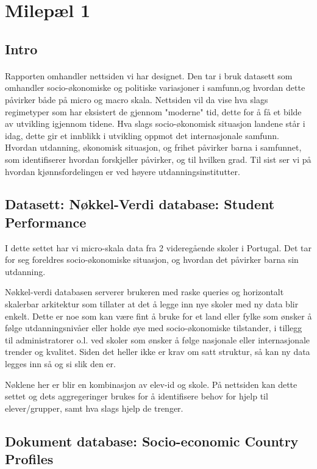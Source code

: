 
\section{Milepæl 1}

\subsection{Intro}
\paragraph{}
Rapporten omhandler nettsiden vi har designet. Den tar i bruk datasett som omhandler socio-økonomiske og politiske variasjoner i samfunn,og hvordan dette påvirker både på micro og macro skala. 
Nettsiden vil da vise hva slags regimetyper som har eksistert de gjennom "moderne" tid, dette for å få et bilde av utvikling igjennom tidene. Hva slags socio-økonomisk situasjon landene står i idag, dette gir et innblikk i utvikling oppmot det internasjonale samfunn. Hvordan utdanning, økonomisk situasjon, og frihet påvirker barna i samfunnet, som identifiserer hvordan forskjeller påvirker, og til hvilken grad. Til sist ser vi på hvordan kjønnsfordelingen er ved høyere utdanningsinstitutter.

\subsection{Datasett: Nøkkel-Verdi database: Student Performance}
I dette settet har vi micro-skala data fra 2 videregående skoler i Portugal. Det tar for seg foreldres socio-økonomiske situasjon, og hvordan det påvirker barna sin utdanning.

Nøkkel-verdi databasen serverer brukeren med raske queries og horizontalt skalerbar arkitektur som tillater at det å legge inn nye skoler med ny data blir enkelt. Dette er noe som kan være fint å bruke for et land eller fylke som ønsker å følge utdanningsnivåer eller holde øye med socio-økonomiske tilstander, i tillegg til administratorer o.l. ved skoler som ønsker å følge nasjonale eller internasjonale trender og kvalitet. Siden det heller ikke er krav om satt struktur, så kan ny data legges inn så og si slik den er.

Nøklene her er blir en kombinasjon av elev-id og skole. På nettsiden kan dette settet og dets aggregeringer brukes for å identifisere behov for hjelp til elever/grupper, samt hva slags hjelp de trenger.


\subsection{Dokument database: Socio-economic Country Profiles}

